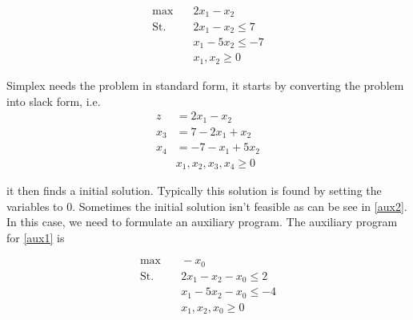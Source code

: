 \documentclass[10pt]{article}
\begin{document}
\begin{align}
  \max &\quad 2x_1 - x_2 \label{aux1}\\ 
  \text{St.} &\quad  2x_1 - x_2  \leq 7 \nonumber\\
             &\quad  x_1 - 5x_2  \leq -7 \nonumber\\
             &\quad  x_1, x_2    \geq 0 
\end{align}

Simplex needs the problem in standard form, it starts by converting the problem into slack form, i.e.
\begin{align}
  z  &= 2x_1 - x_2 \label{aux2}\\ 
  x_3 &= 7 - 2x_1 + x_2 \nonumber\\
  x_4 &= -7-x_1 + 5x_2  \nonumber\\
  &x_1, x_2, x_3, x_4    \geq 0 
\end{align}


it then finds a initial solution. Typically this solution is found by setting the variables to $0$. Sometimes the initial solution isn't feasible as can be see in \ref{aux2}. In this case, we need to formulate an auxiliary program. The auxiliary program for \ref{aux1} is

\begin{align}
  \max &\quad -x_0 \\ 
  \text{St.} &\quad  2x_1 - x_2 -x_0 \leq 2 \nonumber\\
             &\quad  x_1 - 5x_2 -x_0 \leq -4 \nonumber\\
             &\quad  x_1, x_2,x_0    \geq 0 \nonumber 
\end{align}
 
\end{document}
